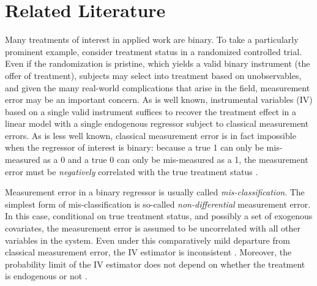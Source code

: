 \section{Related Literature}
Many treatments of interest in applied work are binary.
To take a particularly prominent example, consider treatment status in a randomized controlled trial.
Even if the randomization is pristine, which yields a valid binary instrument (the offer of treatment), subjects may select into treatment based on unobservables, and given the many real-world complications that arise in the field, measurement error may be an important concern.
As is well known, instrumental variables (IV) based on a single valid instrument suffices to recover the treatment effect in a linear model with a single endogenous regressor subject to classical measurement errors.
As is less well known, classical measurement error is in fact impossible when the regressor of interest is binary: because a true 1 can only be mis-measured as a 0 and a true 0 can only be mis-measured as a 1, the measurement error must be \emph{negatively} correlated with the true treatment status \citep{Aigner,Bollinger}. 

Measurement error in a binary regressor is usually called \emph{mis-classification}.
The simplest form of mis-classification is so-called \emph{non-differential} measurement error.
In this case, conditional on true treatment status, and possibly a set of exogenous covariates, the measurement error is assumed to be uncorrelated with all other variables in the system.
Even under this comparatively mild departure from classical measurement error, the IV estimator is inconsistent \citep{BBS, KRS}. 
Moreover, the probability limit of the IV estimator does not depend on whether the treatment is endogenous or not \citep{FL}.

